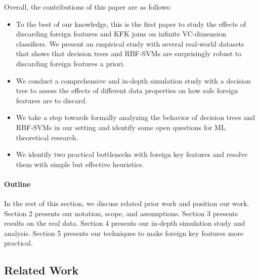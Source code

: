 \documentclass[sigconf]{acmart}
\newenvironment{packeditems}{
\begin{itemize}
  \setlength{\itemsep}{1pt}
  \setlength{\parskip}{0pt}
  \setlength{\parsep}{0pt}
}{\end{itemize}}
\begin{document}
\vspace{1mm}
\noindent Overall, the contributions of this paper are as follows:

\begin{packeditems}
\item To the best of our knowledge, this is the first paper to study the effects of discarding foreign features and KFK joins on infinite VC-dimension classifiers.
We present an empirical study with several real-world datasets that shows that decision trees and RBF-SVMs are surprisingly robust to discarding foreign features a priori.

\item We conduct a comprehensive and in-depth simulation study with a decision tree to assess the effects of different data properties on how safe foreign features are to discard.

\item We take a step towards formally analyzing the behavior of decision trees and RBF-SVMs in our setting and identify some open questions for ML theoretical research.

\item We identify two practical bottlenecks with foreign key features and resolve them with simple but effective heuristics.
\end{packeditems}


\paragraph*{\textbf{Outline}} In the rest of this section, we discuss related prior work and position our work. Section 2 presents our notation, scope, and assumptions. 
Section 3 presents results on the real data. Section 4 presents our in-depth simulation study and analysis. Section 5 presents our techniques to make foreign key features
more practical. %

\subsection*{Related Work}

\end{document}
